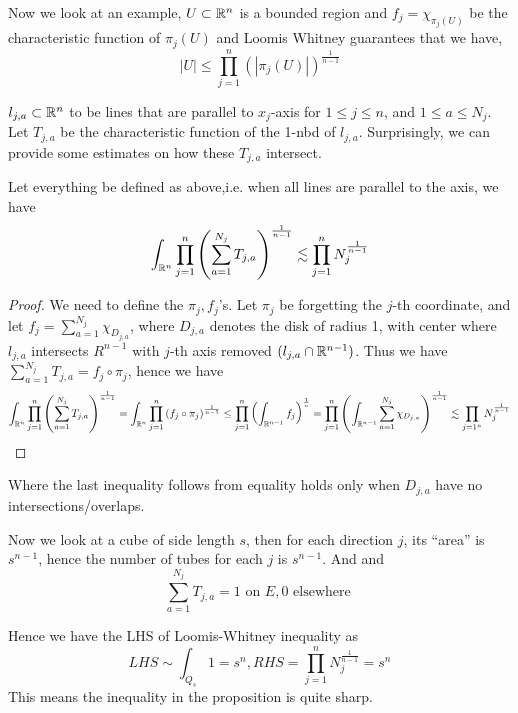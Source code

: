 Now we look at an example, $U\subset\mathbb{R}^n$ is a bounded region and $f_j=\chi_{\pi_j(U)}$ be the characteristic function of $\pi_j(U)$ and Loomis Whitney guarantees that we have,
\begin{equation*}
    |U|\leq\prod_{j=1}^n(|\pi_j(U)|)^{\frac{1}{n-1}}
\end{equation*}

$l_{j,a}\subset\mathbb{R}^n$ to be lines that are parallel to $x_j$-axis for $1\leq j\leq n$, and $1\leq a\leq N_j$. Let $T_{j,a}$ be the characteristic function of the 1-nbd of $l_{j,a}$. Surprisingly, we can provide some estimates on how these $T_{j,a}$ intersect.

\begin{proposition}
    Let everything be defined as above,i.e. when all lines are parallel to the axis, we have
    \begin{equation*}
        \int_{\mathbb{R}^n}\prod_{j=1}^n\left(\sum_{a=1}^{N_j}T_{j,a}\right)^{\frac{1}{n-1}}\lesssim \prod_{j=1}^nN_j^{\frac{1}{n-1}}
    \end{equation*}
\end{proposition}
\begin{proof}
    We need to define the $\pi_j, f_j$'s. Let $\pi_j$ be forgetting the $j$-th coordinate, and let $f_j=\sum_{a=1}^{N_j}\chi_{D_{j,a}}$, where $D_{j,a}$ denotes the disk of radius 1, with center where $l_{j,a}$ intersects $R^{n-1}$ with $j$-th axis removed $(l_{j,a}\cap\mathbb{R}^{n-1})$. Thus we have $\sum_{a=1}^{N_j}T_{j,a}=f_j\circ\pi_j$, hence we have
    \begin{equation*}
        \int_{\mathbb{R}^n}\prod_{j=1}^n\left(\sum_{a=1}^{N_j}T_{j,a}\right)^{\frac{1}{n-1}}=\int_{\mathbb{R}^n}\prod_{j=1}^n\left(f_j\circ\pi_j\right)^{\frac{1}{n-1}}\leq \prod_{j=1}^n\left(\int_{\mathbb{R}^{n-1}}f_j\right)^{\frac{1}{n}}=\prod_{j=1}^n\left(\int_{\mathbb{R}^{n-1}}\sum_{a=1}^{N_j}\chi_{D_{j,a}}\right)^{\frac{1}{n-1}}\lesssim \prod_{j=1^n}N_j^{\frac{1}{n-1}}
    \end{equation*}
\end{proof}
Where the last inequality follows from equality holds only when $D_{j,a}$ have no intersections/overlaps. 

\begin{example}
    Now we look at a cube of side length $s$, then for each direction $j$, its ``area'' is $s^{n-1}$, hence the number of tubes for each $j$ is $s^{n-1}$. And and 
    \begin{equation*}
        \sum_{a=1}^{N_j}T_{j,a}=1 \text{ on } E, 0 \text{ elsewhere }
    \end{equation*}
\end{example}
Hence we have the LHS of Loomis-Whitney inequality as
\begin{equation*}
    LHS\sim\int_{Q_s}1=s^n, RHS=\prod_{j=1}^nN_j^{\frac{1}{n-1}}=s^n
\end{equation*}
This means the inequality in the proposition is quite sharp.

